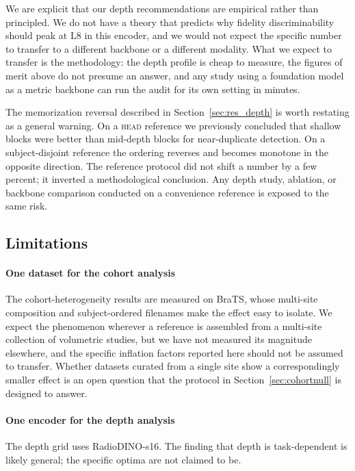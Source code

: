\documentclass[preprint,12pt,authoryear]{elsarticle}
\newcommand{\Lb}[1]{\ensuremath{\mathrm{L}#1}}
\begin{document}
We are explicit that our depth recommendations are empirical rather than
principled. We do not have a theory that predicts why fidelity discriminability
should peak at \Lb{8} in this encoder, and we would not expect the specific
number to transfer to a different backbone or a different modality. What we
expect to transfer is the methodology: the depth profile is cheap to measure,
the figures of merit above do not presume an answer, and any study using a
foundation model as a metric backbone can run the audit for its own setting in
minutes.

The memorization reversal described in Section~\ref{sec:res_depth} is worth
restating as a general warning. On a \textsc{head} reference we previously
concluded that shallow blocks were better than mid-depth blocks for
near-duplicate detection. On a subject-disjoint reference the ordering reverses
and becomes monotone in the opposite direction. The reference protocol did not
shift a number by a few percent; it inverted a methodological conclusion. Any
depth study, ablation, or backbone comparison conducted on a convenience
reference is exposed to the same risk.

\subsection{Limitations}

\paragraph{One dataset for the cohort analysis}
The cohort-heterogeneity results are measured on BraTS, whose multi-site
composition and subject-ordered filenames make the effect easy to isolate. We
expect the phenomenon wherever a reference is assembled from a multi-site
collection of volumetric studies, but we have not measured its magnitude
elsewhere, and the specific inflation factors reported here should not be
assumed to transfer. Whether datasets curated from a single site show a
correspondingly smaller effect is an open question that the protocol in
Section~\ref{sec:cohortnull} is designed to answer.

\paragraph{One encoder for the depth analysis}
The depth grid uses RadioDINO-s16. The finding that depth is task-dependent is
likely general; the specific optima are not claimed to be.
\end{document}
